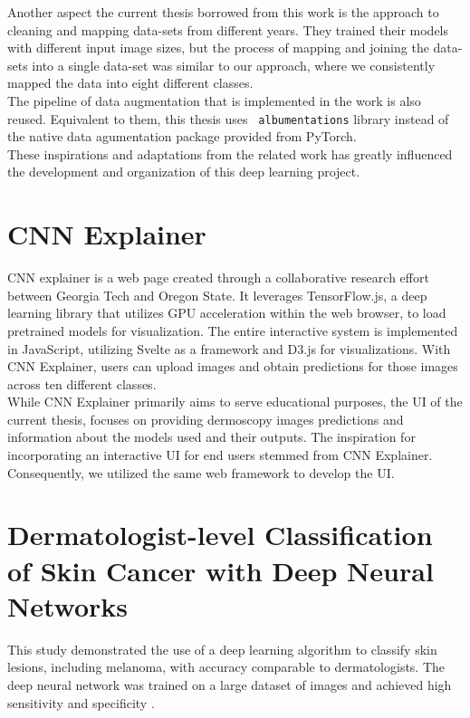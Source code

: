 Another aspect the current thesis borrowed from this work is the approach to
cleaning and mapping data-sets from different years. They trained their models
with different input image sizes, but the process of mapping and joining the
data-sets into a single data-set was similar to our approach, where we
consistently mapped the data into eight different classes. \\

The pipeline of data augmentation that is implemented in the work is also
reused. Equivalent to them, this thesis uses {\tt
albumentations}\cite{Albumentations} library instead of the native data
agumentation package provided from PyTorch. \\

These inspirations and adaptations from the related work has greatly influenced
the development and organization of this deep learning project.

\section{CNN Explainer}

CNN explainer is a web page created through a collaborative research effort
between Georgia Tech and Oregon State\cite{CNNExplainer}. It leverages
TensorFlow.js, a deep learning library that utilizes GPU acceleration within
the web browser, to load pretrained models for visualization. The entire
interactive system is implemented in JavaScript, utilizing Svelte as a
framework and D3.js for visualizations. With CNN Explainer, users can upload
images and obtain predictions for those images across ten different classes.
\\

While CNN Explainer primarily aims to serve educational purposes, the UI of the
current thesis, focuses on providing dermoscopy images predictions and
information about the models used and their outputs. The inspiration for
incorporating an interactive UI for end users stemmed from CNN Explainer.
Consequently, we utilized the same web framework to develop the UI.

\section{Dermatologist-level Classification of Skin Cancer with
Deep Neural Networks}

This study demonstrated the use of a deep learning algorithm to classify skin
lesions, including melanoma, with accuracy comparable to dermatologists. The
deep neural network was trained on a large dataset of images and achieved high
sensitivity and specificity \cite{SkinCancerDeepNN}.

